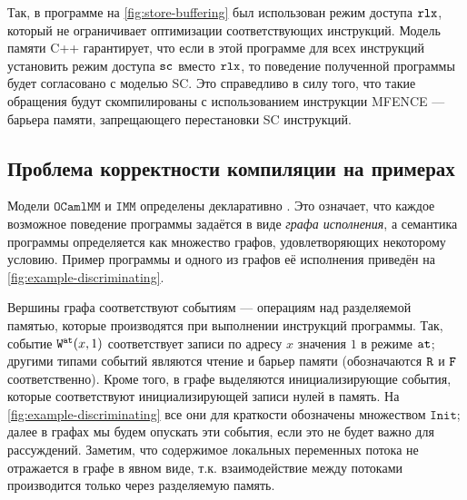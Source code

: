 \documentclass[14pt]{matmex-diploma-custom}
\newcommand{\IMM}{\mathtt{IMM}}
\newcommand{\OMM}{\mathtt{OCaml}\allowbreak \mathtt{MM}}
\newcommand{\defn}[1]{\textit{#1}}
\begin{document}
Так, в программе на \cref{fig:store-buffering} был использован режим доступа $\mathtt{rlx}$, который не ограничивает оптимизации соответствующих инструкций. Модель памяти C++ гарантирует, что если в этой программе для всех инструкций установить режим доступа ${\mathtt{sc}}$ вместо $\mathtt{rlx}$, то поведение полученной программы будет согласовано с моделью SC. Это справедливо в силу того, что  такие обращения будут скомпилированы с использованием инструкции MFENCE \cite{cpp-mappings} --- барьера памяти, запрещающего перестановки SC инструкций.


\subsection{Проблема корректности компиляции на примерах} \label{corr-comp-example}

Модели $\OMM$ и $\IMM$ определены декларативно \cite{power}. Это означает, что каждое возможное поведение программы задаётся в виде \defn{графа исполнения}, а семантика программы определяется как множество графов, удовлетворяющих некоторому условию. Пример программы и одного из графов её исполнения приведён на \cref{fig:example-discriminating}.


Вершины графа соответствуют событиям --- операциям над разделяемой памятью, которые производятся при выполнении инструкций программы. Так, событие ${\mathtt{W}}^{{\mathtt{at}}}(x, 1)$ соответствует записи по адресу $x$ значения $1$ в режиме ${\mathtt{at}}$; другими типами событий являются чтение и барьер памяти (обозначаются ${\mathtt{R}}$ и ${\mathtt{F}}$ соответственно). Кроме того, в графе выделяются инициализирующие события, которые соответствуют инициализирующей записи нулей в память. На \cref{fig:example-discriminating} все они для краткости обозначены множеством $\mathtt{Init}$; далее в графах мы будем опускать эти события, если это не будет важно для рассуждений. Заметим, что содержимое локальных переменных потока не отражается в графе в явном виде, т.к. взаимодействие между потоками производится только через разделяемую память. 
\end{document}
